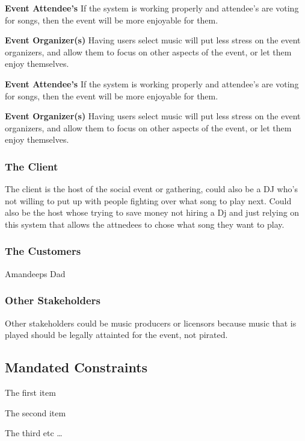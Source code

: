 \documentclass[12pt, titlepage]{article}
\begin{document}
\textbf{Event Attendee's}
If the system is working properly and attendee's are voting for songs, then
the event will be more enjoyable for them.

\textbf{Event Organizer(s)}
Having users select music will put less stress on the event organizers, and
allow them to focus on other aspects of the event, or let them enjoy
themselves.

\textbf{Event Attendee's}
If the system is working properly and attendee's are voting for songs, then
the event will be more enjoyable for them.

\textbf{Event Organizer(s)}
Having users select music will put less stress on the event organizers, and
allow them to focus on other aspects of the event, or let them enjoy
themselves.

\subsubsection{The Client}

The client is the host of the social event or gathering, could also be a DJ
who's not willing to put up with people fighting over what song to play next.
Could also be the host whose trying to save money not hiring a Dj and just
relying on this system that allows the attnedees to chose what song they want
to play.

\subsubsection{The Customers}
Amandeeps Dad

\subsubsection{Other Stakeholders}
Other stakeholders could be music producers or licensors because music that is
played should be legally attainted for the event, not pirated.

\subsection{Mandated Constraints}

\begin{list_type}
\item The first item
\item The second item
\item The third etc \ldots
\end{list_type}
\end{document}
